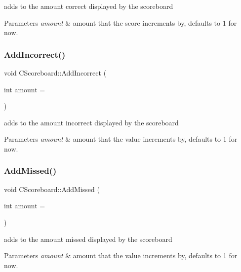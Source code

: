 adds to the amount correct displayed by the scoreboard 
\begin{DoxyParams}{Parameters}
{\em amount} & amount that the score increments by, defaults to 1 for now. \\
\hline
\end{DoxyParams}
\mbox{\label{class_c_scoreboard_a931d264ccc846f1c91db0ef875ba0389}} 
\subsubsection{\texorpdfstring{AddIncorrect()}{AddIncorrect()}}
{\footnotesize\ttfamily void C\+Scoreboard\+::\+Add\+Incorrect (\begin{DoxyParamCaption}\item[{int}]{amount = {} }\end{DoxyParamCaption})\hspace{0.3cm}{\ttfamily [inline]}}

adds to the amount incorrect displayed by the scoreboard 
\begin{DoxyParams}{Parameters}
{\em amount} & amount that the value increments by, defaults to 1 for now. \\
\hline
\end{DoxyParams}
\mbox{\label{class_c_scoreboard_a22c18eda1cb527d4fc2102486132f0b1}} 
\subsubsection{\texorpdfstring{AddMissed()}{AddMissed()}}
{\footnotesize\ttfamily void C\+Scoreboard\+::\+Add\+Missed (\begin{DoxyParamCaption}\item[{int}]{amount = {} }\end{DoxyParamCaption})\hspace{0.3cm}{\ttfamily [inline]}}

adds to the amount missed displayed by the scoreboard 
\begin{DoxyParams}{Parameters}
{\em amount} & amount that the value increments by, defaults to 1 for now. \\
\hline
\end{DoxyParams}
\mbox{\label{class_c_scoreboard_a7c961d101942e7d7b42294105457d828}} 
